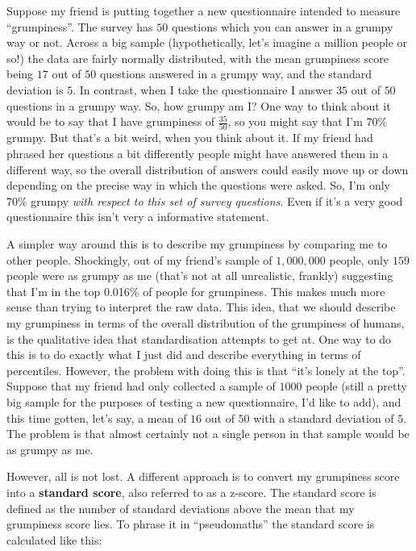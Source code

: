 \documentclass[
]{book}
\begin{document}
Suppose my friend is putting together a new questionnaire intended to measure ``grumpiness''. The survey has \(50\) questions which you can answer in a grumpy way or not. Across a big sample (hypothetically, let's imagine a million people or so!) the data are fairly normally distributed, with the mean grumpiness score being \(17\) out of \(50\) questions answered in a grumpy way, and the standard deviation is \(5\). In contrast, when I take the questionnaire I answer \(35\) out of \(50\) questions in a grumpy way. So, how grumpy am I? One way to think about it would be to say that I have grumpiness of \(\frac{35}{50}\), so you might say that I'm 70\% grumpy. But that's a bit weird, when you think about it. If my friend had phrased her questions a bit differently people might have answered them in a different way, so the overall distribution of answers could easily move up or down depending on the precise way in which the questions were asked. So, I'm only 70\% grumpy \emph{with respect to this set of survey questions}. Even if it's a very good questionnaire this isn't very a informative statement.

A simpler way around this is to describe my grumpiness by comparing me to other people. Shockingly, out of my friend's sample of \(1,000,000\) people, only \(159\) people were as grumpy as me (that's not at all unrealistic, frankly) suggesting that I'm in the top 0.016\% of people for grumpiness. This makes much more sense than trying to interpret the raw data. This idea, that we should describe my grumpiness in terms of the overall distribution of the grumpiness of humans, is the qualitative idea that standardisation attempts to get at. One way to do this is to do exactly what I just did and describe everything in terms of percentiles. However, the problem with doing this is that ``it's lonely at the top''. Suppose that my friend had only collected a sample of \(1000\) people (still a pretty big sample for the purposes of testing a new questionnaire, I'd like to add), and this time gotten, let's say, a mean of \(16\) out of \(50\) with a standard deviation of \(5\). The problem is that almost certainly not a single person in that sample would be as grumpy as me.

However, all is not lost. A different approach is to convert my grumpiness score into a \textbf{standard score}, also referred to as a z-score. The standard score is defined as the number of standard deviations above the mean that my grumpiness score lies. To phrase it in ``pseudomaths'' the standard score is calculated like this:
\end{document}
